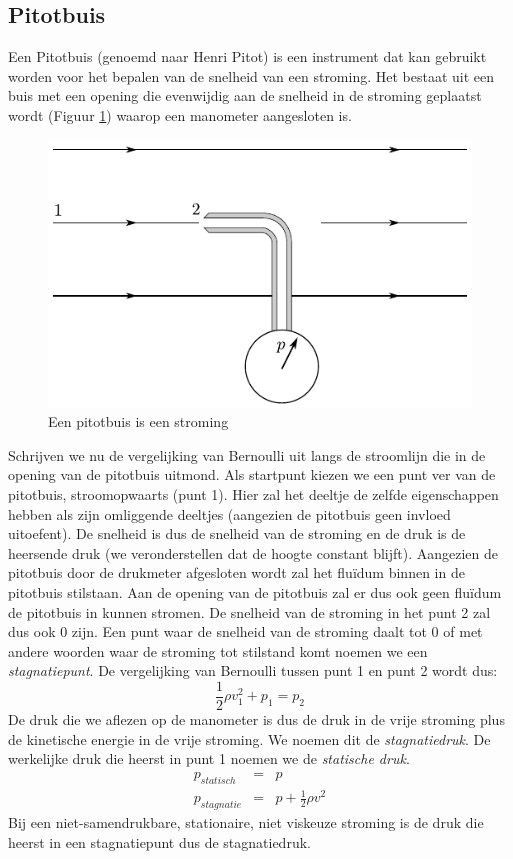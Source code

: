 		\subsection{Pitotbuis}
Een Pitotbuis (genoemd naar Henri Pitot) is een instrument dat kan gebruikt worden voor het bepalen van de snelheid van een stroming. Het bestaat uit een buis met een opening die evenwijdig aan de snelheid in de stroming geplaatst wordt (Figuur \ref{fig:pitotbuis}) waarop een manometer aangesloten is.
\begin{figure}[htb]
	\centering
	\includegraphics{fig/deeltjesvergelijkingen/Pitotbuis}
	\caption{Een pitotbuis is een stroming}
	\label{fig:pitotbuis}
\end{figure}
Schrijven we nu de vergelijking van Bernoulli uit langs de stroomlijn die in de opening van de pitotbuis uitmond. Als startpunt kiezen we een punt ver van de pitotbuis, stroomopwaarts (punt 1). Hier zal het deeltje de zelfde eigenschappen hebben als zijn omliggende deeltjes (aangezien de pitotbuis geen invloed uitoefent). De snelheid is dus de snelheid van de stroming en de druk is de heersende druk (we veronderstellen dat de hoogte constant blijft). Aangezien de pitotbuis door de drukmeter afgesloten wordt zal het fluïdum binnen in de pitotbuis stilstaan. Aan de opening van de pitotbuis zal er dus ook geen fluïdum de pitotbuis in kunnen stromen. De snelheid van de stroming in het punt 2 zal dus ook 0 zijn. Een punt waar de snelheid van de stroming daalt tot 0 of met andere woorden waar de stroming tot stilstand komt noemen we een \emph{stagnatiepunt}. De vergelijking van Bernoulli tussen punt 1 en punt 2 wordt dus:
\begin{equation}
	\frac{1}{2} \rho v_1^2 + p_1 = p_2
\end{equation}
De druk die we aflezen op de manometer is dus de druk in de vrije stroming plus de kinetische energie in de vrije stroming. We noemen dit de \emph{stagnatiedruk}. De werkelijke druk die heerst in punt 1 noemen we de \emph{statische druk}. 
\begin{eqnarray}
	p_{statisch}  &=& p \\
	p_{stagnatie} &=& p + \frac{1}{2} \rho v^2
\end{eqnarray}
Bij een niet-samendrukbare, stationaire, niet viskeuze stroming is de druk die heerst in een stagnatiepunt dus de stagnatiedruk.

